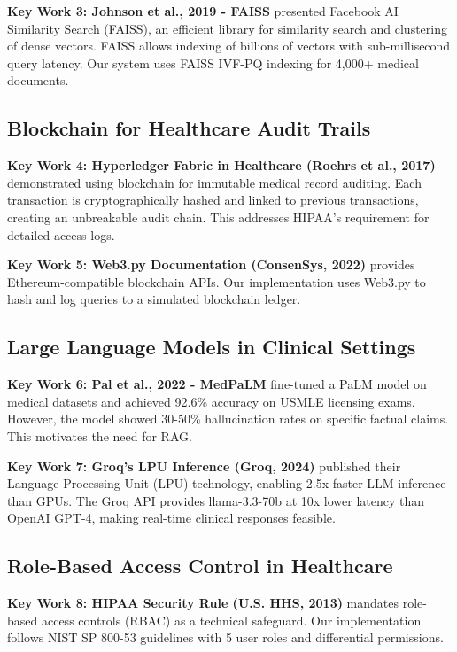 \documentclass[12pt,singleside,a4paper]{article}
\begin{document}
\textbf{Key Work 3: Johnson et al., 2019 - FAISS}
\cite{johnson2019faiss} presented Facebook AI Similarity Search (FAISS), an efficient library for similarity search and clustering of dense vectors. FAISS allows indexing of billions of vectors with sub-millisecond query latency. Our system uses FAISS IVF-PQ indexing for 4,000+ medical documents.

\subsection{Blockchain for Healthcare Audit Trails}

\textbf{Key Work 4: Hyperledger Fabric in Healthcare (Roehrs et al., 2017)}
\cite{roehrs2017blockchain} demonstrated using blockchain for immutable medical record auditing. Each transaction is cryptographically hashed and linked to previous transactions, creating an unbreakable audit chain. This addresses HIPAA's requirement for detailed access logs.

\textbf{Key Work 5: Web3.py Documentation (ConsenSys, 2022)}
\cite{web3py2022} provides Ethereum-compatible blockchain APIs. Our implementation uses Web3.py to hash and log queries to a simulated blockchain ledger.

\subsection{Large Language Models in Clinical Settings}

\textbf{Key Work 6: Pal et al., 2022 - MedPaLM}
\cite{medpalm2022} fine-tuned a PaLM model on medical datasets and achieved 92.6\% accuracy on USMLE licensing exams. However, the model showed 30-50\% hallucination rates on specific factual claims. This motivates the need for RAG.

\textbf{Key Work 7: Groq's LPU Inference (Groq, 2024)}
\cite{groq2024} published their Language Processing Unit (LPU) technology, enabling 2.5x faster LLM inference than GPUs. The Groq API provides llama-3.3-70b at 10x lower latency than OpenAI GPT-4, making real-time clinical responses feasible.

\subsection{Role-Based Access Control in Healthcare}

\textbf{Key Work 8: HIPAA Security Rule (U.S. HHS, 2013)}
\cite{hipaa2013} mandates role-based access controls (RBAC) as a technical safeguard. Our implementation follows NIST SP 800-53 guidelines with 5 user roles and differential permissions.
\end{document}
